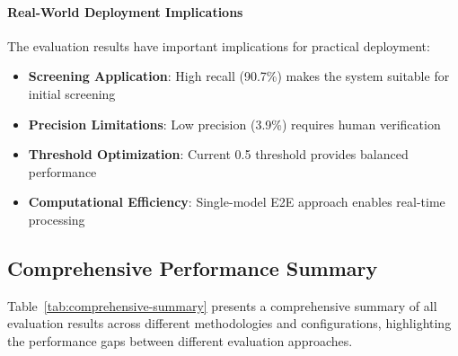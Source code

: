 \documentclass[11pt]{article}
\begin{document}
\paragraph{Real-World Deployment Implications}
The evaluation results have important implications for practical deployment:

\begin{itemize}
    \item \textbf{Screening Application}: High recall (90.7\%) makes the system suitable for initial screening
    \item \textbf{Precision Limitations}: Low precision (3.9\%) requires human verification
    \item \textbf{Threshold Optimization}: Current 0.5 threshold provides balanced performance
    \item \textbf{Computational Efficiency}: Single-model E2E approach enables real-time processing
\end{itemize}

\subsection{Comprehensive Performance Summary}
Table~\ref{tab:comprehensive-summary} presents a comprehensive summary of all evaluation results across different methodologies and configurations, highlighting the performance gaps between different evaluation approaches.
\end{document}

